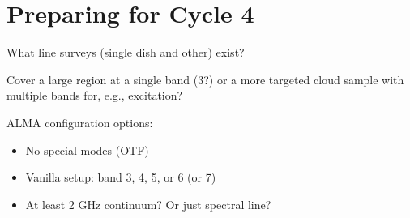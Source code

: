 \section{Preparing for Cycle 4}

What line surveys (single dish and other) exist?

Cover a large region at a single band (3?) or a more targeted cloud sample with multiple bands for, e.g., excitation?


ALMA configuration options:

\begin{itemize}
    \item No special modes (OTF)
    \item Vanilla setup: band 3, 4, 5, or 6 (or 7)
    \item At least 2 GHz continuum?  Or just spectral line?
\end{itemize}
